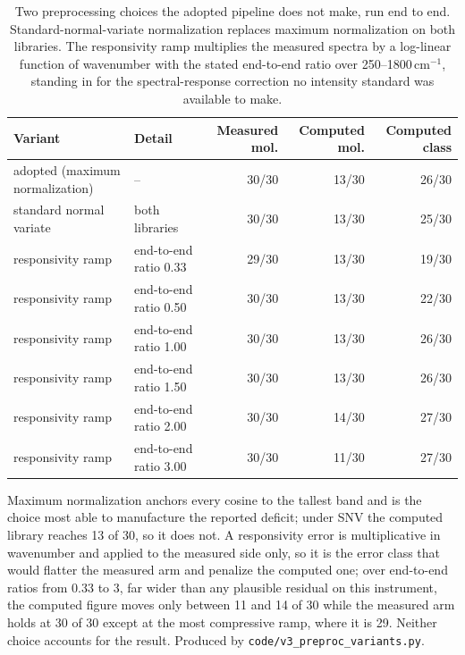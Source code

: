 \documentclass[11pt]{article}
\newcommand*\wn{\ensuremath{\text{cm}^{-1}}}
\begin{document}
\begin{table}[htbp]
\centering
\caption{Two preprocessing choices the adopted pipeline does not make, run end to end. Standard-normal-variate normalization replaces maximum normalization on both libraries. The responsivity ramp multiplies the measured spectra by a log-linear function of wavenumber with the stated end-to-end ratio over 250--1800\,\wn{}, standing in for the spectral-response correction no intensity standard was available to make.}
\label{tab:si-prepvar}
\small
\begin{tabular}{llrrr}
\toprule
Variant & Detail & Measured mol. & Computed mol. & Computed class \\
\midrule
adopted (maximum normalization) & -- & 30/30 & 13/30 & 26/30 \\
standard normal variate & both libraries & 30/30 & 13/30 & 25/30 \\
responsivity ramp & end-to-end ratio 0.33 & 29/30 & 13/30 & 19/30 \\
responsivity ramp & end-to-end ratio 0.50 & 30/30 & 13/30 & 22/30 \\
responsivity ramp & end-to-end ratio 1.00 & 30/30 & 13/30 & 26/30 \\
responsivity ramp & end-to-end ratio 1.50 & 30/30 & 13/30 & 26/30 \\
responsivity ramp & end-to-end ratio 2.00 & 30/30 & 14/30 & 27/30 \\
responsivity ramp & end-to-end ratio 3.00 & 30/30 & 11/30 & 27/30 \\
\bottomrule
\end{tabular}

\begin{flushleft}\footnotesize Maximum normalization anchors every cosine to the tallest band and is the choice most able to manufacture the reported deficit; under SNV the computed library reaches 13 of 30, so it does not. A responsivity error is multiplicative in wavenumber and applied to the measured side only, so it is the error class that would flatter the measured arm and penalize the computed one; over end-to-end ratios from 0.33 to 3, far wider than any plausible residual on this instrument, the computed figure moves only between 11 and 14 of 30 while the measured arm holds at 30 of 30 except at the most compressive ramp, where it is 29. Neither choice accounts for the result. Produced by \texttt{code/v3\_preproc\_variants.py}.\end{flushleft}
\end{table}
\end{document}
